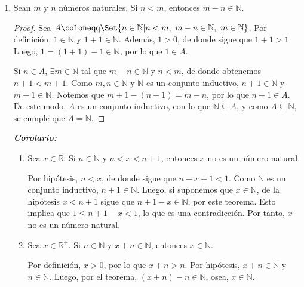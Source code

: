 \documentclass[11pt]{article}
\newcommand{\N}{\mathbb{N}}
\newcommand{\R}{\mathbb{R}}
\let\set\Set
\begin{document}
\begin{enumerate}[label=\alph*)]
    \item Sean $m$ y $n$ números naturales. Si $n<m$, entonces $m-n\in\N$.
    \vspace{-1em}\begin{proof} 
        Sea $A \coloneqq \set{n\in \N| n<m, \ m-n\in\N, \ m\in \N}$. Por definición, $1\in \N$ y $1+1\in \N$. Además, $1>0$, de donde sigue que $1+1>1$. Luego, $1=(1+1)-1\in \N$, por lo que $1\in A$. 

        Si $n \in A$, $\exists m\in \N$ tal que $m-n\in \N$ y $n<m$, de donde obtenemos $n+1<m+1$. Como $m,n\in \N$ y $\N$ es un conjunto inductivo, $n+1\in \N$ y $m+1 \in \N$. Notemos que $m+1-(n+1)=m-n$, por lo que $n+1\in A$. De este modo, $A$ es un conjunto inductivo, con lo que $\N \subseteq A$, y como $A\subseteq \N$, se cumple que $A=\N$.
    \end{proof} \vspace{-1em}

    \textbf{\textit{Corolario:}} \begin{enumerate}[label=\roman*)]
        \item Sea $x\in \R$. Si $n\in \N$ y $n<x<n+1$, entonces $x$ no es un número natural.
        
        Por hipótesis, $n<x$, de donde sigue que $n-x+1<1$. Como $\N$ es un conjunto inductivo, $n+1\in \N$. Luego, si suponemos que $x\in \N$, de la hipótesis	$x<n+1$ sigue que $n+1-x\in \N$, por este teorema. Esto implica que $1\leq n+1-x < 1$, lo que es una contradicción. Por tanto, $x$ no es un número natural.

        \item Sea $x\in \R^+$. Si $n\in \N$ y $x+n\in \N$, entonces $x\in \N$.

        Por definición, $x>0$, por lo que $x+n>n$. Por hipótesis, $x+n\in \N$ y $n\in \N$. Luego, por el teorema, $(x+n)-n \in \N$, osea, $x\in \N$.


\end{enumerate}
\end{enumerate}
\end{document}
